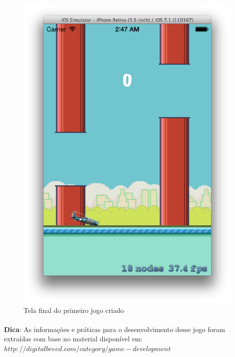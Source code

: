 \documentclass[a4paper,12pt,brazil,oneside]{book}
\begin{document}
\begin{figure}[H]
  \centering
  \includegraphics[width=.75\textwidth]{figuras/6/plane6.png}
  \caption{Tela final do primeiro jogo criado}
  \label{fig:a}
\end{figure}

\begin{framed}
\paragraph{}\textbf{Dica}: As informações e práticas para o desenvolvimento desse jogo foram extraídas com base no material disponível em:
\textit{ \\\(http://digitalbreed.com/category/game-development\)}
\end{framed}

\singlespace
{}
\cleardoublepage
\thispagestyle{empty}
{}


\doublespace
\end{document}
